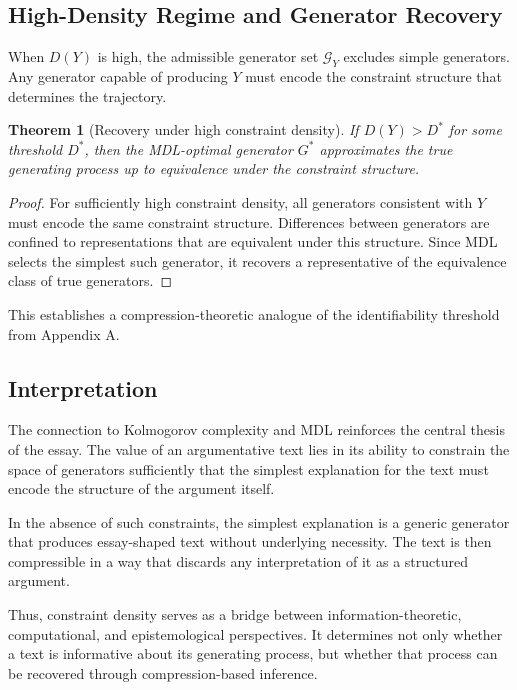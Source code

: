 \documentclass[12pt, oneside]{article}
\theoremstyle{plain}
\newtheorem{theorem}{Theorem}[section]
\theoremstyle{definition}
\theoremstyle{remark}
\begin{document}
\subsection{High-Density Regime and Generator Recovery}

When $D(Y)$ is high, the admissible generator set $\mathcal{G}_Y$ excludes simple
generators. Any generator capable of producing $Y$ must encode the constraint
structure that determines the trajectory.

\begin{theorem}[Recovery under high constraint density]
If $D(Y) > D^*$ for some threshold $D^*$, then the MDL-optimal generator $G^*$
approximates the true generating process up to equivalence under the constraint
structure.
\end{theorem}

\begin{proof}
For sufficiently high constraint density, all generators consistent with $Y$ must
encode the same constraint structure. Differences between generators are confined
to representations that are equivalent under this structure. Since MDL selects the
simplest such generator, it recovers a representative of the equivalence class of
true generators.
\end{proof}

This establishes a compression-theoretic analogue of the identifiability threshold
from Appendix A.

\subsection{Interpretation}

The connection to Kolmogorov complexity and MDL reinforces the central thesis of
the essay. The value of an argumentative text lies in its ability to constrain the
space of generators sufficiently that the simplest explanation for the text must
encode the structure of the argument itself.

In the absence of such constraints, the simplest explanation is a generic
generator that produces essay-shaped text without underlying necessity. The text
is then compressible in a way that discards any interpretation of it as a
structured argument.

Thus, constraint density serves as a bridge between information-theoretic,
computational, and epistemological perspectives. It determines not only whether a
text is informative about its generating process, but whether that process can be
recovered through compression-based inference.
\end{document}
